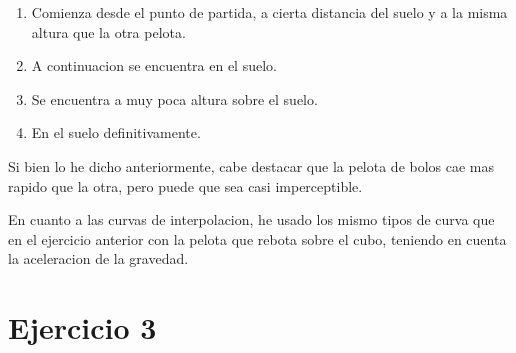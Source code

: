 \documentclass{article}
\begin{document}
\begin{enumerate}
    \item Comienza desde el punto de partida, a cierta distancia del suelo y a la misma altura que la otra pelota.
    \item A continuacion se encuentra en el suelo.
    \item Se encuentra a muy poca altura sobre el suelo.
    \item En el suelo definitivamente.
\end{enumerate}


Si bien lo he dicho anteriormente, cabe destacar que la pelota de bolos cae mas rapido que la otra, pero puede que sea casi imperceptible.

En cuanto a las curvas de interpolacion, he usado los mismo tipos de curva que en el ejercicio anterior con la pelota que rebota sobre el cubo, teniendo en cuenta la aceleracion de la gravedad. 



\section{Ejercicio 3}
\end{document}
